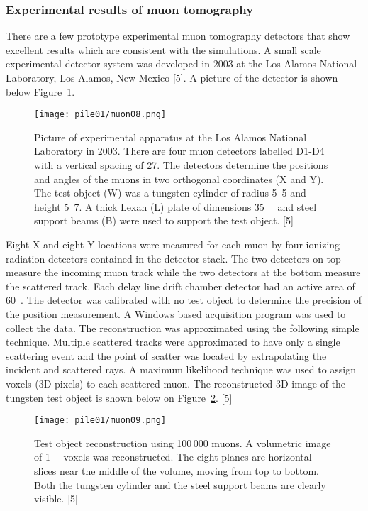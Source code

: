 \documentclass[a4paper]{article}
\begin{document}
\subsubsection{Experimental results of muon tomography}
There are a few prototype experimental muon tomography detectors that show excellent results
which are consistent with the simulations.
A small scale experimental detector system was developed in 2003 at the Los Alamos National
Laboratory, Los Alamos, New Mexico [5]. A picture of the detector is shown below Figure~\ref{muon08}.

\begin{figure}[h!]
  \texttt{[image: pile01/muon08.png]}
  \caption{Picture of experimental apparatus at the Los Alamos National Laboratory in 2003. There
are four muon detectors labelled D1-D4 with a vertical spacing of \unit{27}{\centi\metre}. The detectors determine
the positions and angles of the muons in two orthogonal coordinates (X and Y). The test object (W)
was a tungsten cylinder of radius \unit{5.5}{\centi\metre} and height \unit{5.7}{\centi\metre}. A thick Lexan (L) plate of dimensions
\unit{35}{\cubic{\centi\metre}} and steel support beams (B) were used to support the test object. [5]}
  \label{muon08}
\end{figure}

Eight X and eight Y locations were measured for each muon by four ionizing radiation detectors
contained in the detector stack. The two detectors on top measure the incoming muon track while
the two detectors at the bottom measure the scattered track. Each delay line drift chamber detector
had an active area of \unit{60}{\square{\centi\metre}}. The detector was calibrated with no test object to determine the
precision of the position measurement. A Windows based acquisition program was used to collect
the data. The reconstruction was approximated using the following simple technique. Multiple
scattered tracks were approximated to have only a single scattering event and the point of scatter
was located by extrapolating the incident and scattered rays. A maximum likelihood technique was
used to assign voxels (3D pixels) to each scattered muon. The reconstructed 3D image of the
tungsten test object is shown below on Figure~\ref{muon09}. [5]

\begin{figure}[h!]
  \texttt{[image: pile01/muon09.png]}
  \caption{Test object reconstruction using 100\,000 muons. A volumetric image of \unit{1}{\cubic{\centi\metre}} voxels
was reconstructed. The eight planes are horizontal slices near the middle of the volume, moving
from top to bottom. Both the tungsten cylinder and the steel support beams are clearly visible. [5]}
  \label{muon09}
\end{figure}
\end{document}

